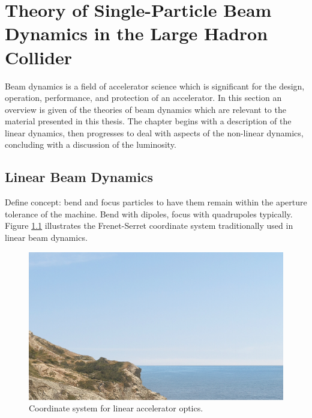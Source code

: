 
\chapter{Theory of Single-Particle Beam Dynamics in the Large Hadron Collider} %

\label{Chapter1} %


Beam dynamics is a field of accelerator science which is significant for the design, operation, performance, and protection of an accelerator. 
In this section an overview is given of the theories of beam dynamics which are relevant to the material presented in this thesis.
The chapter begins with a description of the linear dynamics, then progresses to deal with aspects of the non-linear dynamics, concluding with a discussion of the luminosity.


\section{Linear Beam Dynamics}

Define concept: bend and focus particles to have them remain within the aperture tolerance of the machine.
Bend with dipoles, focus with quadrupoles typically.
Figure \ref{fig:frenet_system} illustrates the Frenet-Serret coordinate system traditionally used in linear beam dynamics.
\bigbreak

\begin{figure}[!htb]
    \begin{center}
    \includegraphics[width = 0.7\linewidth]{Figures/placeholder.png}
    \caption{Coordinate system for linear accelerator optics.}
    \label{fig:frenet_system}
    \end{center}
\end{figure}

